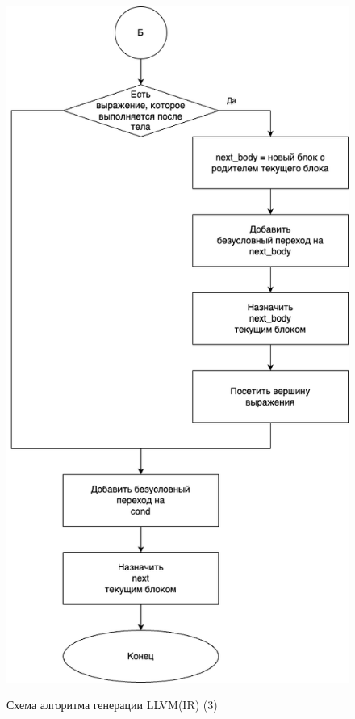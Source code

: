 \begin{figure}[h!]
	\begin{center}
		{\includegraphics[scale = 0.5, angle=0]{../img/llvm/alg-3.png}}
		\caption{Схема алгоритма генерации LLVM(IR) (3)}
		\label{fig:alg-3}
	\end{center}
\end{figure}
